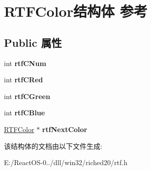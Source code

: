 \hypertarget{struct_r_t_f_color}{}\section{R\+T\+F\+Color结构体 参考}
\label{struct_r_t_f_color}
\subsection*{Public 属性}
\begin{DoxyCompactItemize}
\item 
\mbox{\label{struct_r_t_f_color_a0ff222c100b02ab8238eae0f5e3d0807}} 
int {\bfseries rtf\+C\+Num}
\item 
\mbox{\label{struct_r_t_f_color_a94ce17c6d30321638ab839f3f6b2a115}} 
int {\bfseries rtf\+C\+Red}
\item 
\mbox{\label{struct_r_t_f_color_acf4dc1b2131c29f5bfe48273f0c07f10}} 
int {\bfseries rtf\+C\+Green}
\item 
\mbox{\label{struct_r_t_f_color_a40501c9f064e9e2c007b5c96c3781bd6}} 
int {\bfseries rtf\+C\+Blue}
\item 
\mbox{\label{struct_r_t_f_color_a54e82d15fd5b7a972165c77b69d74ce0}} 
\hyperlink{struct_r_t_f_color}{R\+T\+F\+Color} $\ast$ {\bfseries rtf\+Next\+Color}
\end{DoxyCompactItemize}


该结构体的文档由以下文件生成\+:\begin{DoxyCompactItemize}
\item 
E\+:/\+React\+O\+S-\/0../dll/win32/riched20/rtf.\+h\end{DoxyCompactItemize}
